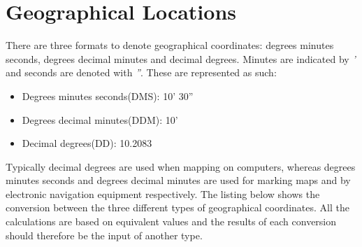 \section{Geographical Locations} \label{sec:geo_coordinates}
There are three formats to denote geographical coordinates: degrees minutes seconds, degrees decimal minutes and decimal degrees\cite{geo_types}. Minutes are indicated by \emph{'} and seconds are denoted with \emph{''}. These are represented as such:
\begin{itemize}
	\item Degrees minutes seconds(DMS): 10' 30''
	\item Degrees decimal minutes(DDM): 10'
	\item Decimal degrees(DD): 10.2083\degree
\end{itemize}

Typically decimal degrees are used when mapping on computers, whereas degrees minutes seconds and degrees decimal minutes are used for marking maps and by electronic navigation equipment respectively\cite{geo_types}. The listing below shows the conversion between the three different types of geographical coordinates. All the calculations are based on equivalent values and the results of each conversion should therefore be the input of another type\cite{geo_converter}.

